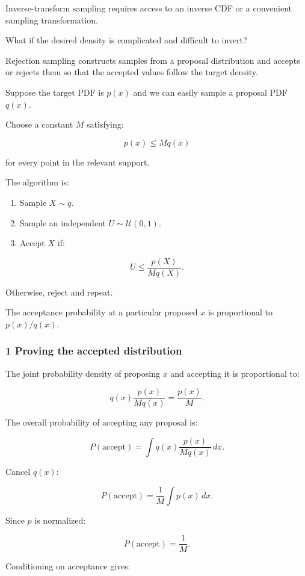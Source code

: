 Inverse-transform sampling requires access to an inverse CDF or a convenient sampling transformation.

What if the desired density is complicated and difficult to invert?

Rejection sampling constructs samples from a proposal distribution and accepts or rejects them so that the accepted values follow the target density.

Suppose the target PDF is \(p(x)\) and we can easily sample a proposal PDF \(q(x)\).

Choose a constant \(M\) satisfying:

\[
 \boxed{ p(x)\le Mq(x) }
\]

for every point in the relevant support.

The algorithm is:

\begin{enumerate}
\def\labelenumi{\arabic{enumi}.}
\tightlist
\item
  Sample \(X\sim q\).
\item
  Sample an independent \(U\sim\mathcal U(0,1)\).
\item
  Accept \(X\) if:
\end{enumerate}

\[
 \boxed{ U\le\frac{p(X)}{Mq(X)} }.
\]

Otherwise, reject and repeat.

The acceptance probability at a particular proposed \(x\) is proportional to \(p(x)/q(x)\).

\subsubsection{1 Proving the accepted distribution}\label{02-foundations-ii-ch029-proving-the-accepted-distribution}

The joint probability density of proposing \(x\) and accepting it is proportional to:

\[
 q(x)\frac{p(x)}{Mq(x)} = \frac{p(x)}M.
\]

The overall probability of accepting any proposal is:

\[
 P(\text{accept}) = \int q(x)\frac{p(x)}{Mq(x)}\,dx.
\]

Cancel \(q(x)\):

\[
 P(\text{accept}) = \frac1M\int p(x)\,dx.
\]

Since \(p\) is normalized:

\[
 \boxed{ P(\text{accept})=\frac1M }.
\]

Conditioning on acceptance gives:

